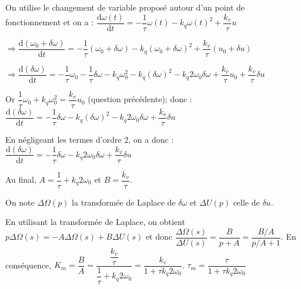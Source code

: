 \ifprof
\begin{corrige}
On utilise le changement de variable proposé autour d'un point de fonctionnement et on a : 
$
\dfrac{\text{d}\omega(t)}{\text{d}t}=-\dfrac{1}{\tau}\omega(t) -k_q\omega(t)^2 + \dfrac{k_v}{\tau}u
$

$
\Rightarrow 
\dfrac{\text{d}\left( \omega_0+\delta \omega \right)}{\text{d}t}=-\dfrac{1}{\tau}\left( \omega_0+\delta \omega\right) -k_q\left( \omega_0+\delta\omega \right)^2 + \dfrac{k_v}{\tau}\left( u_0+\delta u\right)
$

$
\Rightarrow 
\dfrac{\text{d}\left(\delta \omega \right)}{\text{d}t}=-\dfrac{1}{\tau} \omega_0-\dfrac{1}{\tau}\delta \omega -k_q \omega_0^2-k_q\left(\delta\omega\right)^2 -k_q2 \omega_0 \delta\omega + \dfrac{k_v}{\tau} u_0+\dfrac{k_v}{\tau} \delta u
$

Or $\dfrac{1}{\tau}\omega_0 +k_q\omega_0^2 = \dfrac{k_v}{\tau}u_0$ (question précédente); donc :
$
\dfrac{\text{d}\left(\delta \omega \right)}{\text{d}t}= -\dfrac{1}{\tau}\delta \omega-k_q\left(\delta\omega\right)^2 -k_q2 \omega_0 \delta\omega + \dfrac{k_v}{\tau} \delta u
$

En négligeant les termes d'ordre 2, on a donc : 
$
\dfrac{\text{d}\left(\delta \omega \right)}{\text{d}t}= -\dfrac{1}{\tau}\delta \omega -k_q2 \omega_0 \delta\omega + \dfrac{k_v}{\tau} \delta u
$

Au final, $A=\dfrac{1}{\tau}+k_q2 \omega_0$ et $B=\dfrac{k_v}{\tau}$.
\end{corrige}
\else
\fi
On note $\Delta \Omega (p)$ la transformée de Laplace de $\delta \omega$ et $\Delta U(p)$ celle de $\delta u$.


\ifprof
\begin{corrige}
En utilisant la transformée de Laplace, on obtient $p\Delta\Omega(s) = -A\Delta\Omega(s) + B \Delta U(s)$ et donc 
 $\dfrac{\Delta{\Omega(s)}}{\Delta U(s)}= \dfrac{B}{p+A} = \dfrac{B/A}{p/A+1}  $. 
 En conséquence, $K_m = \dfrac{B}{A} = \dfrac{\dfrac{k_v}{\tau}}{\dfrac{1}{\tau}+k_q2 \omega_0}= \dfrac{k_v}{1+\tau k_q2 \omega_0}$. 
 $\tau_m = \dfrac{\tau}{1+\tau k_q2 \omega_0} $ 
\end{corrige}
\else
\fi
